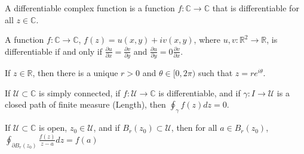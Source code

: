 \documentclass[crop=false,class=book,oneside]{standalone}
\begin{document}
\begin{definition}
A differentiable complex function is a function $f:\mathbb{C}\rightarrow\mathbb{C}$ that is differentiable for all $z\in\mathbb{C}$.
\end{definition}
\begin{theorem}
A function $f:\mathbb{C}\rightarrow\mathbb{C}$, $f(z)=u(x,y)+iv(x,y)$, where $u,v:\mathbb{R}^{2}\rightarrow \mathbb{R}$, is differentiable if and only if $\frac{\partial u}{\partial x}=\frac{\partial v}{\partial y}$ and $\frac{\partial u}{\partial y} = 0\frac{\partial v}{\partial x}$.
\end{theorem}
\begin{theorem}
If $z\in\mathbb{R}$, then there is a unique $r>0$ and $\theta\in[0,2\pi)$ such that $z=re^{i\theta}$.
\end{theorem}
\begin{theorem}
If $\mathcal{U}\subset\mathbb{C}$ is simply connected, if $f:\mathcal{U}\rightarrow \mathbb{C}$ is differentiable, and if $\gamma:I\rightarrow \mathcal{U}$ is a closed path of finite measure (Length), then $\oint_{\gamma}f(z)dz = 0$.
\end{theorem}
\begin{theorem}
If $\mathcal{U}\subset\mathbb{C}$ is open, $z_{0}\in\mathcal{U}$, and if $B_{r}(z_{0})\subset\mathcal{U}$, then for all $a\in B_{r}(z_{0})$, $\oint_{\partial B_{r}(z_{0})}\frac{f(z)}{z-a}dz = f(a)$
\end{theorem}
\end{document}
